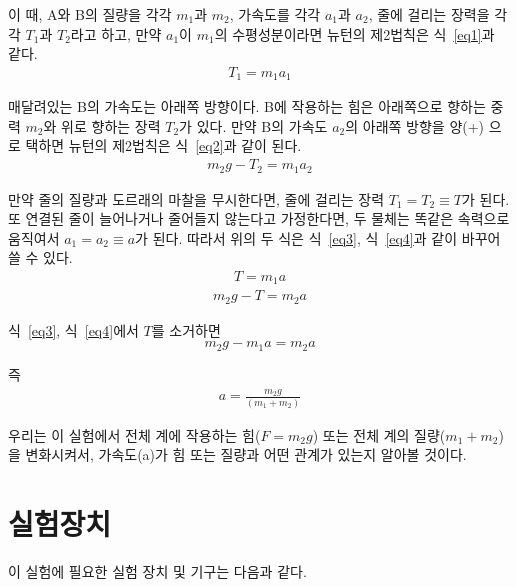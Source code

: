 \documentclass[12pt,a4paper]{article}
\begin{document}
이 때, A와 B의 질량을 각각 $m_1$과 $m_2$, 가속도를 각각 $a_1$과 $a_2$, 줄에 걸리는
장력을 각각 $T_1$과 $T_2$라고 하고, 만약 $a_1$이 $m_1$의 수평성분이라면
뉴턴의 제2법칙은 식~\ref{eq1}과 같다.
\begin{equation}
    \begin{aligned}
        T_1 = m_1a_1
        \label{eq1}
    \end{aligned}
\end{equation}

매달려있는 B의 가속도는 아래쪽 방향이다. B에 작용하는 힘은 아래쪽으로 향하는 중력
$m_2$와 위로 향하는 장력 $T_2$가 있다. 만약 B의 가속도 $a_2$의 아래쪽 방향을 양(+)
으로 택하면 뉴턴의 제2법칙은 식~\ref{eq2}과 같이 된다.
\begin{equation}
    \begin{aligned}
        m_2g-T_2=m_1a_2
        \label{eq2}
    \end{aligned}
\end{equation}

만약 줄의 질량과 도르래의 마찰을 무시한다면, 줄에 걸리는 장력 $T_1=T_2\equiv T$가
된다. 또 연결된 줄이 늘어나거나 줄어들지 않는다고 가정한다면, 두 물체는 똑같은
속력으로 움직여서 $a_1=a_2\equiv a$가 된다. 따라서 위의 두 식은 식~\ref{eq3},
식~\ref{eq4}과 같이 바꾸어 쓸 수 있다.
\begin{equation}
    \begin{aligned}
        T=m_1a
        \label{eq3}
    \end{aligned}
\end{equation}
\begin{equation}
    \begin{aligned}
        m_2g-T=m_2a
        \label{eq4}
    \end{aligned}
\end{equation}

식~\ref{eq3}, 식~\ref{eq4}에서 $T$를 소거하면
$$m_2g-m_1a=m_2a$$

즉
\begin{equation}
    \begin{aligned}
        a=\frac{m_2g}{(m_1+m_2)}
        \label{eq5}
    \end{aligned}
\end{equation}

우리는 이 실험에서 전체 계에 작용하는 힘($F=m_2g$) 또는 전체 계의 질량($m_1+m_2$)을
변화시켜서, 가속도(a)가 힘 또는 질량과 어떤 관계가 있는지 알아볼 것이다.
\section{실험장치}
이 실험에 필요한 실험 장치 및 기구는 다음과 같다.
\end{document}
